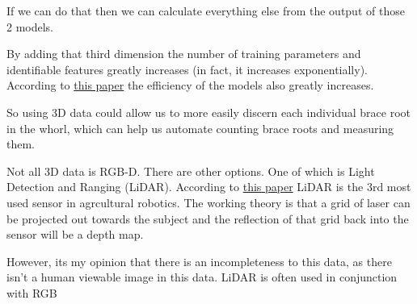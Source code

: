 \documentclass[11pt]{article}
\begin{document}
If we can do that then we can calculate everything else from the output
of those 2 models.

By adding that third dimension the number of training parameters and
identifiable features greatly increases (in fact, it increases
exponentially). According to
\href{https://arxiv.org/pdf/2101.07612}{this paper} the efficiency of
the models also greatly increases.

So using 3D data could allow us to more easily discern each individual
brace root in the whorl, which can help us automate counting brace roots
and measuring them.

    Not all 3D data is RGB-D. There are other options. One of which is Light
Detection and Ranging (LiDAR). According to
\href{https://www.mdpi.com/2075-1702/11/1/48}{this paper} LiDAR is the
3rd most used sensor in agrcultural robotics. The working theory is that
a grid of laser can be projected out towards the subject and the
reflection of that grid back into the sensor will be a depth map.

However, its my opinion that there is an incompleteness to this data, as
there isn't a human viewable image in this data. LiDAR is often used in
conjunction with RGB
\end{document}
